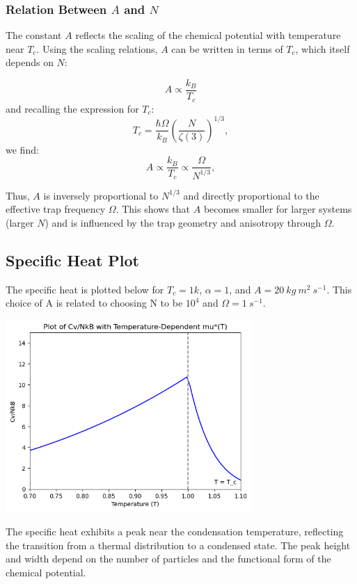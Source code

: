 \documentclass{article}
\numberwithin{equation}{section}
\numberwithin{equation}{subsection}
\begin{document}
\subsubsection{Relation Between \(A\) and \(N\)}

The constant \(A\) reflects the scaling of the chemical potential with temperature near \(T_c\). Using the scaling relations, \(A\) can be written in terms of \(T_c\), which itself depends on \(N\):

\[
A \propto \frac{k_B}{T_c}
\]
and recalling the expression for \(T_c\):
\[
T_c = \frac{\hbar\Omega}{k_B} \left( \frac{N}{\zeta(3)} \right)^{1/3},
\]
we find:
\[
A \propto \frac{k_B}{T_c}  \propto \frac{\Omega}{N^{1/3}},
\]

Thus, \(A\) is inversely proportional to \(N^{1/3}\) and directly proportional to the effective trap frequency \(\Omega\). This shows that \(A\) becomes smaller for larger systems (larger \(N\)) and is influenced by the trap geometry and anisotropy through \(\Omega\).\\

\subsection{Specific Heat Plot}
The specific heat is plotted below for  $T_c = 1k$, $\alpha = 1$, and $A = 20\ kg\ m^2\ s^{-1}$. This choice of A is related to choosing N to be $10^{4}$ and $\Omega = 1\ s^{-1}$. 
\begin{center}
    \includegraphics[width=0.7\textwidth]{output.png}
\end{center}
The specific heat exhibits a peak near the condensation temperature, reflecting the transition from a thermal distribution to a condensed state. The peak height and width depend on the number of particles and the functional form of the chemical potential.
\end{document}
